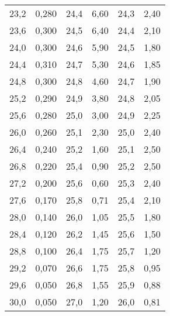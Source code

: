 \begin{longtable}{S[table-format=3.2] S[table-format=3.2] S[table-format=3.2] S[table-format=3.2] S[table-format=3.2] S[table-format=3.2]}
          23,2   &   0,280  &     24,4    &  6,60   & 24,3   &   2,40                                      \\
          23,6   &   0,300  &     24,5    &  6,40   & 24,4   &   2,10                                      \\
          24,0   &   0,300  &     24,6    &  5,90   & 24,5   &   1,80                                      \\
          24,4   &   0,310  &     24,7    &  5,30   & 24,6   &   1,85                                      \\
          24,8   &   0,300  &     24,8    &  4,60   & 24,7   &   1,90                                      \\
          25,2   &   0,290  &     24,9    &  3,80   & 24,8   &   2,05                                      \\
          25,6   &   0,280  &     25,0    &  3,00   & 24,9   &   2,25                                      \\
          26,0   &   0,260  &     25,1    &  2,30   & 25,0   &   2,40                                      \\
          26,4   &   0,240  &     25,2    &  1,60   & 25,1   &   2,50                                      \\
          26,8   &   0,220  &     25,4    &  0,90   & 25,2   &   2,50                                      \\
          27,2   &   0,200  &     25,6    &  0,60   & 25,3   &   2,40                                      \\
          27,6   &   0,170  &     25,8    &  0,71   & 25,4   &   2,10                                      \\
          28,0   &   0,140  &     26,0    &  1,05   & 25,5   &   1,80                                      \\
          28,4   &   0,120  &     26,2    &  1,45   & 25,6   &   1,50                                      \\
          28,8   &   0,100  &     26,4    &  1,75   & 25,7   &   1,20                                      \\
          29,2   &   0,070  &     26,6    &  1,75   & 25,8   &   0,95                                      \\
          29,6   &   0,050  &     26,8    &  1,55   & 25,9   &   0,88                                      \\
          30,0   &   0,050  &     27,0    &  1,20   & 26,0   &   0,81                                      \\

\end{longtable}

